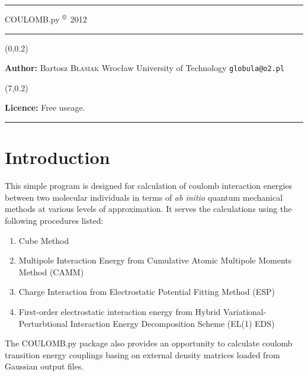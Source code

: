 \documentclass[a4paper,titlepage,twoside,fleqn]{article}
\begin{document}
\begin{center}
\rule{1cm}{1cm}
\hfill
\rm \Large COULOMB.py $^\copyright$ 2012 
\end{center}
\rule{14cm}{1mm}
\begin{textblock}{5.0}(0,0.2)
\begin{minipage}{1.0\textwidth}
\begin{flushleft} %
\textbf{Author:} \newline
Bartosz \textsc{B{\l}asiak} \newline
Wroc{\l}aw University of Technology \newline
\verb+globula@o2.pl+
\end{flushleft}
\end{minipage}
\end{textblock}

\begin{textblock}{3.0}(7,0.2)
\begin{minipage}{1.0\textwidth}
\begin{flushleft} %
\textbf{Licence:} \newline
Free useage.
\end{flushleft}
\end{minipage}
\end{textblock}
\hfill\vspace{2 cm}
\rule{14cm}{0.2mm}

\tableofcontents
\clearpage
\section{Introduction}
%
This simple program is designed for calculation of coulomb 
interaction energies between two molecular individuals
in terms of \emph{ab initio} quantum mechanical methods 
at various levels of approximation. It serves the calculations
using the following procedures listed:
%
\begin{enumerate}
   \item Cube Method
   \item Multipole Interaction Energy from 
         Cumulative Atomic Multipole Moments Method (CAMM)
   \item Charge Interaction from Electrostatic Potential 
         Fitting Method (ESP)
   \item First-order electrostatic interaction energy from 
         Hybrid Variational-Perturbtional Interaction Energy
         Decomposition Scheme (EL(1) EDS)
\end{enumerate}
%
The {\sc COULOMB.py} package also provides an opportunity to
calculate coulomb transition energy couplings basing on external 
density matrices loaded from {\rm Gaussian} output files. 
\end{document}
